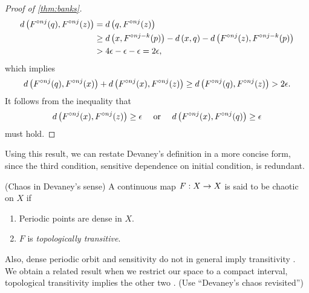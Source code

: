 \documentclass[12pt,draft,twoside]{book}
\begin{document}
\begin{proof}[Proof of \ref{thm:banks}]
\begin{align*}
    d\left( F^{\circ nj}(q), F^{\circ nj}(z) \right) 
    &= d\left( q, F^{\circ nj}(z) \right)  \\
    &\geq  d\left( x, F^{\circ nj-k}(p) \right) - d\left( x,q \right) - d\left( F^{\circ nj}(z), F^{\circ nj - k}(p) \right)  \\
    &> 4\epsilon - \epsilon - \epsilon 
    = 2\epsilon,
  \end{align*}
  which implies
  \begin{equation*}
    d\left( F^{\circ nj}(q), F^{\circ nj}(x) \right) + d\left( F^{\circ nj}(x), F^{\circ nj}(z) \right) 
    \geq d\left( F^{\circ nj}(q), F^{\circ nj}(z) \right)
    > 2\epsilon.
  \end{equation*}
  It follows from the inequality that 
  \begin{equation*}
    d\left( F^{\circ nj}(x), F^{\circ nj}(z) \right) \geq \epsilon \quad\mbox{ or }\quad d\left( F^{\circ nj}(x), F^{\circ nj}(q) \right) \geq \epsilon 
  \end{equation*}
  must hold.
\end{proof}

Using this result, we can restate Devaney's definition in a more concise form, since the third condition, sensitive dependence on initial condition, is redundant.
\begin{definition}
  (Chaos in Devaney's sense) 
  A continuous map $F: X\rightarrow X$ is said to be chaotic on $X$ if
  \begin{enumerate}
    \item Periodic points are dense in $X$.
    \item $F$ is \textit{topologically transitive}.
  \end{enumerate}
\end{definition}
Also, dense periodic orbit and sensitivity do not in general imply transitivity \citep{assaf}.
We obtain a related result when we restrict our space to a compact interval, topological transitivity implies the other two \citep{silverman}.
(Use ``Devaney's chaos revisited'')
\end{document}
